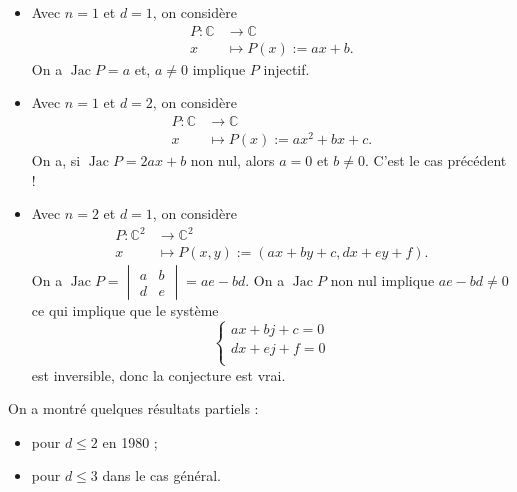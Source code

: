 \documentclass[./main]{subfiles}
\begin{document}
  \begin{exm}
    \begin{itemize}
      \item Avec $n = 1$ et $d = 1$, on considère
        \begin{align*}
          P: \mathds{C} &\longrightarrow \mathds{C} \\
          x &\longmapsto P(x) := ax + b
        .\end{align*}
        On a $\operatorname{Jac} P = a$ et,  $a \neq 0$ implique $P$ injectif.
      \item Avec $n = 1$ et $d = 2$, on considère
        \begin{align*}
          P: \mathds{C} &\longrightarrow \mathds{C} \\
          x &\longmapsto P(x) := ax^2 + bx + c
        .\end{align*}
        On a, si $\operatorname{Jac} P = 2ax + b$ non nul, alors $a = 0$ et $b \neq 0$.
        C'est le cas précédent !
      \item Avec $n = 2$ et $d = 1$, on considère
        \begin{align*}
          P: \mathds{C}^2 &\longrightarrow \mathds{C}^2 \\
          x &\longmapsto P(x,y) := (ax + by +c, dx + ey + f)
        .\end{align*}
        On a $\operatorname{Jac} P = \begin{vmatrix} a & b \\ d & e \end{vmatrix} = ae - bd$.
        On a $\operatorname{Jac} P$ non nul implique  $ae - bd \neq 0$ ce qui implique que le système 
        \[
        \begin{cases}
          ax + bj + c = 0\\
          dx + ej + f = 0\\
        \end{cases}
        \] est inversible, donc la conjecture est vrai.
    \end{itemize}
  \end{exm}

  On a montré quelques résultats partiels :
  \begin{itemize}
    \item pour $d \le 2$ en 1980 ;
    \item pour $d \le 3$ dans le cas général.
  \end{itemize}
\end{document}
